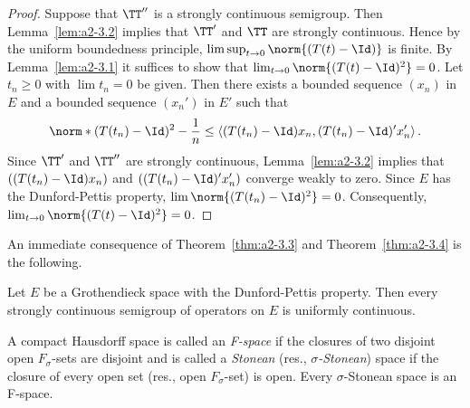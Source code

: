 \begin{proof}
Suppose that $\TT''$ is a strongly continuous semigroup.
Then Lemma~\ref{lem:a2-3.2}   implies that $\TT'$ and $\TT$ are strongly continuous.
Hence by the uniform boundedness principle, $\lim \sup_{t \to 0} \norm{(T(t) - \Id)}$ is finite.
By Lemma~\ref{lem:a2-3.1}   it suffices to show that $\lim_{t \to 0} \norm{(T(t) - \Id)^2} = 0$.
Let $t_{n} \geq 0$ with $\lim t_{n} = 0$ be given.
Then there exists a bounded sequence $(x_{n})$ in $E$ and a bounded sequence $(x_{n}')$ in $E'$ such that
\[
\norm*{(T(t_{n}) - \Id)^2 } - \frac{1}{n} \leq \langle (T(t_{n}) - \Id)x_{n}, (T(t_{n}) - \Id)'x_{n}' \rangle\,.
\]
Since $\TT'$ and $\TT''$ are strongly continuous, Lemma~\ref{lem:a2-3.2}   implies that $((T(t_{n}) - \Id)x_{n})$ and $((T(t_{n}) - \Id)'x_{n}')$ converge weakly to zero.
Since $E$ has the Dunford-Pettis property, $\lim \norm{(T(t_{n}) - \Id)^2} = 0$.
Consequently, $\lim_{t \to 0} \norm{(T(t) - \Id)^2} = 0$.
\end{proof}

An immediate consequence of Theorem~\ref{thm:a2-3.3}   and Theorem~\ref{thm:a2-3.4}   is the following.

\begin{theorem}\label{thm:a2-3.5}
Let $E$ be a Grothendieck space with the Dunford-Pettis property.
Then every strongly continuous semigroup of operators on $E$ is uniformly continuous.
\end{theorem}
A compact Hausdorff space is called an \emph{F-space} if the closures of two disjoint open $F_{\sigma}$-sets are disjoint and is called a \emph{Stonean} (res., \emph{$\sigma$-Stonean}) space if the closure of every open set (res., open $F_{\sigma}$-set) is open.
Every $\sigma$-Stonean space is an F-space.

